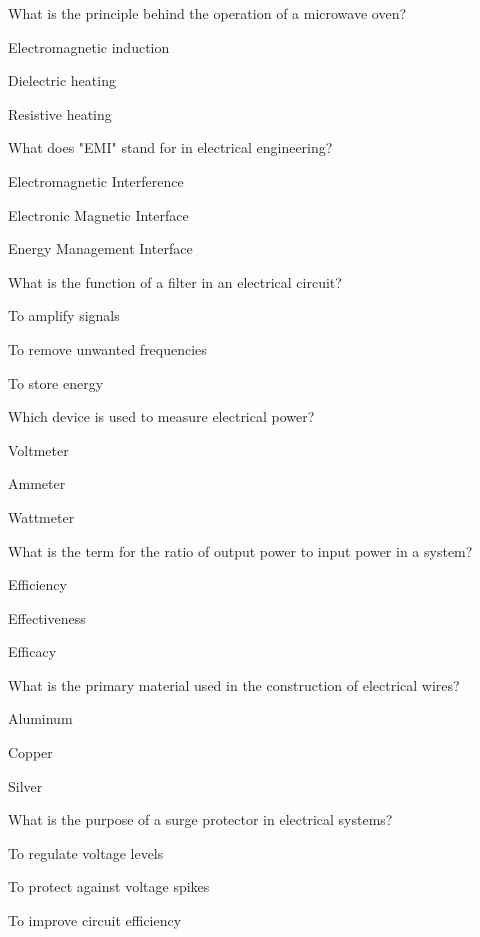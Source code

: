\begin{enhancedmcq}{What is the principle behind the operation of a microwave oven?}
\item Electromagnetic induction
\item Dielectric heating
\item Resistive heating

\end{enhancedmcq}
\begin{enhancedmcq}{What does "EMI" stand for in electrical engineering?}
\item Electromagnetic Interference
\item Electronic Magnetic Interface
\item Energy Management Interface

\end{enhancedmcq}
\begin{enhancedmcq}{What is the function of a filter in an electrical circuit?}
\item To amplify signals
\item To remove unwanted frequencies
\item To store energy

\end{enhancedmcq}
\begin{enhancedmcq}{Which device is used to measure electrical power?}
\item Voltmeter
\item Ammeter
\item Wattmeter

\end{enhancedmcq}
\begin{enhancedmcq}{What is the term for the ratio of output power to input power in a system?}
\item Efficiency
\item Effectiveness
\item Efficacy

\end{enhancedmcq}
\begin{enhancedmcq}{What is the primary material used in the construction of electrical wires?}
\item Aluminum
\item Copper
\item Silver

\end{enhancedmcq}
\begin{enhancedmcq}{What is the purpose of a surge protector in electrical systems?}
\item To regulate voltage levels
\item To protect against voltage spikes
\item To improve circuit efficiency

\end{enhancedmcq}
